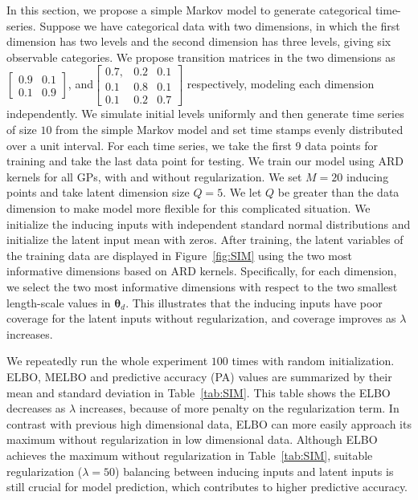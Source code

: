 \documentclass{article}
\begin{document}
In this section, we propose a simple Markov model to generate categorical time-series. Suppose we have categorical data with two dimensions, in which the first dimension has two levels and the second dimension has three levels, giving six observable categories. We propose transition matrices in the two dimensions as $\begin{bmatrix}
0.9 & 0.1\\
0.1 & 0.9
\end{bmatrix}$, 
and$ \begin{bmatrix}
0.7, & 0.2 & 0.1 \\
0.1 & 0.8 & 0.1\\
0.1 & 0.2 & 0.7
\end{bmatrix}$ respectively, modeling each dimension independently. We simulate initial levels uniformly and then generate time series of size $10$ from the simple Markov model and set time stamps evenly distributed over a unit interval. 
For each time series, we take the first 9 data points for training and 
take the last data point for testing. We train our model using ARD kernels for all GPs, with and without regularization. We set $M = 20$ inducing points and take latent dimension size $Q = 5$. We let $Q$ be greater than the data dimension to make model more flexible for this complicated situation. We initialize the inducing inputs with independent standard normal distributions and initialize the latent input mean with zeros. After training, the latent variables of the training data are displayed in Figure~\ref{fig:SIM} using the two most informative dimensions based on ARD kernels. Specifically, for each dimension, we select the two most informative dimensions with respect to the two smallest length-scale values in $\bm\theta_d$. This illustrates that the inducing inputs have poor coverage for the latent inputs without regularization, and coverage improves as $\lambda$ increases.

We repeatedly run the whole experiment $100$ times with random initialization. ELBO, MELBO and predictive accuracy (PA) values are summarized by their mean and standard deviation in Table~\ref{tab:SIM}. This table shows the ELBO decreases as $\lambda$ increases, because of more penalty on the regularization term. In contrast with previous high dimensional data, ELBO can more easily approach its maximum without regularization in low dimensional data. Although ELBO achieves the maximum without regularization in Table~\ref{tab:SIM}, suitable regularization ($\lambda = 50$) balancing between inducing inputs and latent inputs is still crucial for model prediction, which contributes to higher predictive accuracy. 
\end{document}
